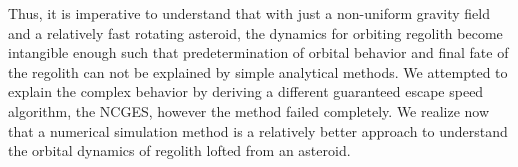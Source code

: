 %
\newline\newline
%
Thus, it is imperative to understand that with just a non-uniform gravity field and a relatively fast rotating asteroid, the dynamics for orbiting regolith become intangible enough such that predetermination of orbital behavior and final fate of the regolith can not be explained by simple analytical methods. We attempted to explain the complex behavior by deriving a different guaranteed escape speed algorithm, the \gls{NCGES}, however the method failed completely. We realize now that a numerical simulation method is a relatively better approach to understand the orbital dynamics of regolith lofted from an asteroid.

